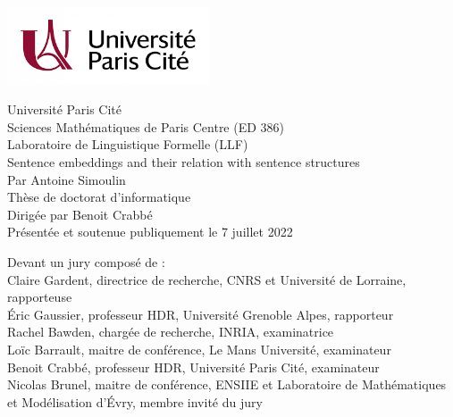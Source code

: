 \begin{titlepage}
\begin{center}
    {
    \includegraphics[width=6cm]{images/paris-cité.png}
        
    \huge
    Université Paris Cité\\
    \large 
    Sciences Mathématiques de Paris Centre (ED 386)\\
    Laboratoire de Linguistique Formelle (LLF)\\[30pt]
    
    \Huge
    Sentence embeddings and their relation with sentence structures\\[56pt]
    
    \LARGE 
    \textmd{Par Antoine Simoulin\\[44pt]
    \Large
    Thèse de doctorat d’informatique\\[20pt]
    Dirigée par Benoit Crabbé \\[20pt]
    \large 
    Présentée et soutenue publiquement le 7 juillet 2022\\[20pt]}
    
    \vspace*{\fill}
    \raggedright\large 
    \textmd{Devant un jury composé de : \\[12pt]
    \normalsize
    Claire Gardent, directrice de recherche, CNRS et Université de Lorraine, rapporteuse\\
    Éric Gaussier, professeur HDR, Université Grenoble Alpes, rapporteur\\
    Rachel Bawden, chargée de recherche, INRIA, examinatrice\\
    Loïc Barrault, maitre de conférence, Le Mans Université, examinateur\\
    Benoit Crabbé, professeur HDR, Université Paris Cité, examinateur\\
    Nicolas Brunel, maitre de conférence, ENSIIE et Laboratoire de Mathématiques et Modélisation d'Évry, membre invité du jury\\}
}
\end{center}
\end{titlepage}